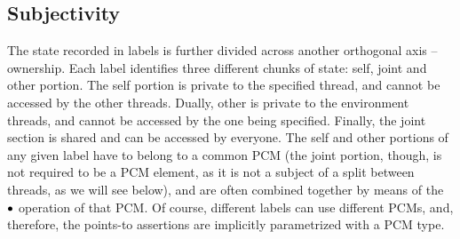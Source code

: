 \subsection{Subjectivity}
The state recorded in labels is further divided across another
orthogonal axis -- ownership. Each label identifies three different
chunks of state: self, joint and other portion. The self portion is
private to the specified thread, and cannot be accessed by the other
threads. Dually, other is private to the environment threads, and
cannot be accessed by the one being specified. Finally, the joint
section is shared and can be accessed by everyone. The self and other
portions of any given label have to belong to a common PCM (the joint
portion, though, is not required to be a PCM element, as it is not a
subject of a split between threads, as we will see below), and are
often combined together by means of the $\bullet$ operation of that
PCM. Of course, different labels can use different PCMs, and,
therefore, the points-to assertions are implicitly parametrized with a
PCM type.

